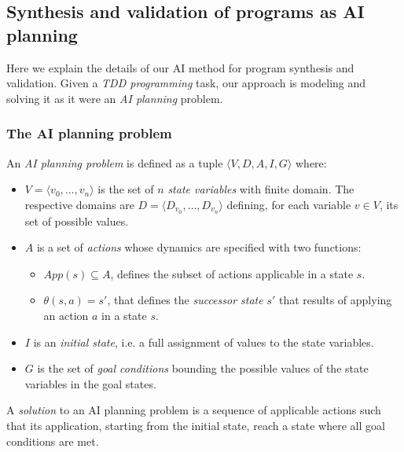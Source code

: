 \documentclass[10pt,a4paper]{paper}
\newcommand{\tup}[1]{{\langle #1 \rangle}}
\begin{document}
\subsection{Synthesis and validation of programs as AI planning}
Here we explain the details of our AI method for program synthesis and validation. Given a {\em TDD programming} task, our approach is modeling and solving it as it were an {\em AI planning} problem.

\subsubsection{The AI planning problem}
An {\em AI planning problem} is defined as a tuple $\tup{V,D,A,I,G}$ where:
\begin{itemize}
\item $V=\tup{v_0, \ldots, v_n}$ is the set of $n$ {\em state variables} with finite domain. The respective domains are $D=\tup{D_{v_0}, \ldots, D_{v_n}}$ defining, for each variable $v\in V$, its set of possible values.
\item $A$ is a set of {\em actions} whose dynamics are specified with two functions:
\begin{itemize}
\item $App(s)\subseteq A$, defines the subset of actions applicable in a state $s$.
\item $\theta(s,a)=s'$, that defines the {\em successor state} $s'$ that results of applying an action $a$ in a state $s$.
\end{itemize}  
\item $I$ is an {\em initial state}, i.e. a full assignment of values to the state variables.
\item $G$ is the set of {\em goal conditions} bounding the possible values of the state variables in the goal states.  
\end{itemize}
A {\em solution} to an AI planning problem is a sequence of applicable actions such that its application, starting from the initial state, reach a state where all goal conditions are met.
\end{document}
